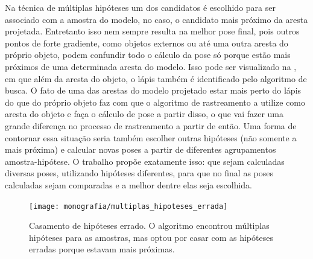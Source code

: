 Na técnica de múltiplas hipóteses um dos candidatos é escolhido para ser associado com a amostra do modelo, no caso, o candidato mais próximo da aresta projetada. Entretanto isso nem sempre resulta na melhor pose final, pois outros pontos de forte gradiente, como objetos externos ou até uma outra aresta do próprio objeto, podem confundir todo o cálculo da pose só porque estão mais próximos de uma determinada aresta do modelo. Isso pode ser visualizado na , em que além da aresta do objeto, o lápis também é identificado pelo algoritmo de busca. O fato de uma das arestas do modelo projetado estar mais perto do lápis do que do próprio objeto faz com que o algoritmo de rastreamento a utilize como aresta do objeto e faça o cálculo de pose a partir disso, o que vai fazer uma grande diferença no processo de rastreamento a partir de então. Uma forma de contornar essa situação seria também escolher outras hipóteses (não somente a mais próxima) e calcular novas poses a partir de diferentes agrupamentos amostra-hipótese. O trabalho \cite{celine} propõe exatamente isso: que sejam calculadas diversas poses, utilizando hipóteses diferentes, para que no final as poses calculadas sejam comparadas e a melhor dentre elas seja escolhida.

\begin{figure}[!ht]
\centering\texttt{[image: monografia/multiplas\_hipoteses\_errada]}
\caption{Casamento de hipóteses errado. O algoritmo encontrou múltiplas hipóteses para as amostras, mas optou por casar com as hipóteses erradas porque estavam mais próximas.}
\label{multiplas_hipoteses_errada}
\end{figure}

